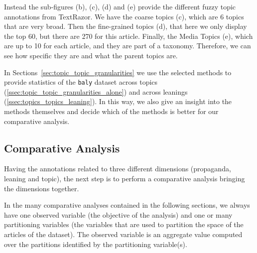 Instead the sub-figures (b), (c), (d) and (e) provide the different fuzzy topic annotations from TextRazor.
We have the coarse topics (c), which are 6 topics that are very broad. Then the fine-grained topics (d), that here we only display the top 60, but there are 270 for this article.
Finally, the Media Topics (e), which are up to 10 for each article, and they are part of a taxonomy.  Therefore, we can see how specific they are and what the parent topics are.


In Sections~\ref{sec:topic_topic_granularities} we use the selected methods to provide statistics of the \texttt{baly} dataset across topics (\ref{ssec:topic_topic_granularities_alone}) and across leanings (\ref{ssec:topics_topics_leaning}). In this way, we also give an insight into the methods themselves and decide which of the methods is better for our comparative analysis.

\subsection{\statusgreen Comparative Analysis}
\label{sec:topic_method_comparative}

Having the annotations related to three different dimensions (propaganda, leaning and topic), the next step is to perform a comparative analysis bringing the dimensions together.

In the many comparative analyses contained in the following sections, we always have one observed variable (the objective of the analysis) and one or many partitioning variables (the variables that are used to partition the space of the articles of the dataset). The observed variable is an aggregate value computed over the partitions identified by the partitioning variable(s).

